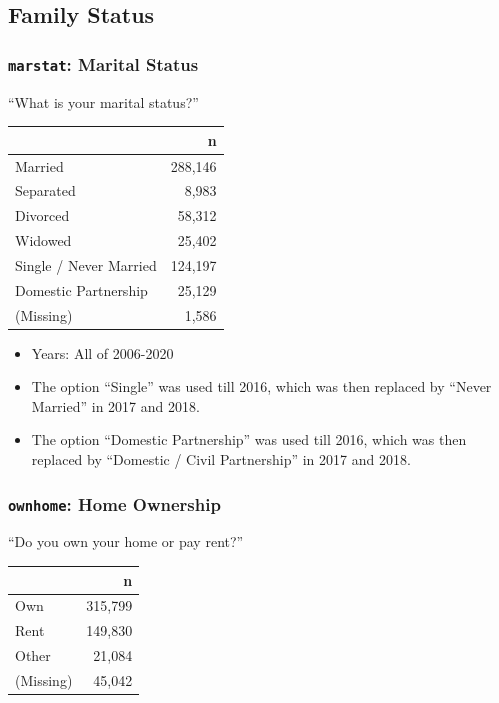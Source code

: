 \documentclass[10pt,article,oneside]{memoir}
\theoremstyle{definition}
\begin{document}
\hypertarget{family-status}{%
\subsection{Family Status}\label{family-status}}

\hypertarget{marstat-marital-status}{%
\subsubsection{\texorpdfstring{\texttt{marstat}: Marital
Status}{marstat: Marital Status}}\label{marstat-marital-status}}

``What is your marital status?''

\begin{table}[H]
\centering
\begin{tabular}{lr}
\toprule
 & n\\
\midrule
Married & 288,146\\
Separated & 8,983\\
Divorced & 58,312\\
Widowed & 25,402\\
Single / Never Married & 124,197\\
Domestic Partnership & 25,129\\
(Missing) & 1,586\\
\bottomrule
\end{tabular}
\end{table}

\begin{itemize}
\tightlist
\item
  Years: All of 2006-2020
\item
  The option ``Single'' was used till 2016, which was then replaced by
  ``Never Married'' in 2017 and 2018.
\item
  The option ``Domestic Partnership'' was used till 2016, which was then
  replaced by ``Domestic / Civil Partnership'' in 2017 and 2018.
\end{itemize}

\hypertarget{ownhome-home-ownership}{%
\subsubsection{\texorpdfstring{\texttt{ownhome}: Home
Ownership}{ownhome: Home Ownership}}\label{ownhome-home-ownership}}

``Do you own your home or pay rent?''

\begin{table}[H]
\centering
\begin{tabular}{lr}
\toprule
 & n\\
\midrule
Own & 315,799\\
Rent & 149,830\\
Other & 21,084\\
(Missing) & 45,042\\
\bottomrule
\end{tabular}
\end{table}
\end{document}
